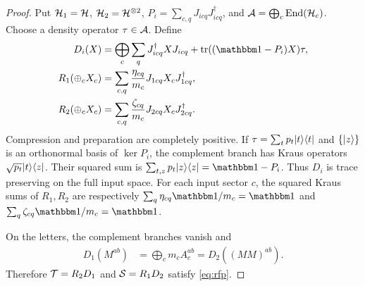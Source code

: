 \begin{proof}
	Put $\mathcal{H}_1=\mathcal{H}$, $\mathcal{H}_2=\mathcal{H}^{\otimes2}$,
	$P_i=\sum_{c,q}J_{icq}J_{icq}^\dagger$, and
	$\mathcal{A}=\bigoplus_c\operatorname{End}(\mathcal{H}_c)$. Choose a density operator
	$\tau\in\mathcal{A}$. Define
	\begin{align}
		D_i(X)
		 & =\bigoplus_c\sum_qJ_{icq}^\dagger XJ_{icq}
		+\tr((\Id-P_i)X)\tau,                         \\
		R_1(\oplus_cX_c)
		 & =\sum_{c,q}\frac{\eta_{cq}}{m_c}
		J_{1cq}X_cJ_{1cq}^\dagger,                    \\
		R_2(\oplus_cX_c)
		 & =\sum_{c,q}\frac{\zeta_{cq}}{m_c}
		J_{2cq}X_cJ_{2cq}^\dagger.
		\label{eq:discard-prepare}
	\end{align}
	Compression and preparation are completely positive. If
	$\tau=\sum_tp_t\lvert t\rangle\langle t\rvert$ and $\{\lvert z\rangle\}$ is an
	orthonormal basis of $\ker P_i$, the complement branch has Kraus
	operators $\sqrt{p_t}\lvert t\rangle\langle z\rvert$. Their squared sum is
	$\sum_{t,z}p_t\ket z\bra z=\Id-P_i$. Thus $D_i$ is trace
	preserving on the full input space. For each input sector $c$, the
	squared Kraus sums of $R_1,R_2$ are respectively
	$\sum_q\eta_{cq}\Id/m_c=\Id$ and
	$\sum_q\zeta_{cq}\Id/m_c=\Id$.

	On the letters, the complement branches vanish and
	\begin{align}
		D_1(M^{ab})
		 & =\bigoplus_cm_cA_c^{ab}
		=D_2((MM)^{ab}).
	\end{align}
	Therefore $\mathcal{T}=R_2D_1$ and $\mathcal{S}=R_1D_2$ satisfy
	\cref{eq:rfp}.
\end{proof}
